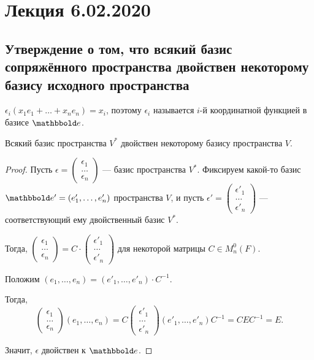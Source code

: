 \section{Лекция 6.02.2020}


\subsection{Утверждение о том, что всякий базис сопряжённого пространства двойствен некоторому базису исходного пространства}

$\epsilon_i (x_1 e_1 + \dots + x_n e_n) = x_i$, поэтому $\epsilon_i$ называется $i$-й координатной функцией в базисе $\E$.

\begin{proposal}
    Всякий базис пространства $V^*$ двойствен некоторому базису пространства $V$. 
\end{proposal}

\begin{proof}
    Пусть $\epsilon = \begin{pmatrix} \epsilon_1 \\ \dots \\ \epsilon_n \end{pmatrix}$ --- базис пространства $V^*$.
    Фиксируем какой-то базис $\E' = (e'_1, \dots, e'_n)$ пространства $V$, и пусть $\epsilon' = \begin{pmatrix} \epsilon'_1 \\ \dots \\ \epsilon'_n \end{pmatrix}$ --- соответствующий ему двойственный базис $V^*$.

    Тогда, 
    $\begin{pmatrix} \epsilon_1 \\ \dots \\ \epsilon_n \end{pmatrix} = C \cdot \begin{pmatrix} \epsilon'_1 \\ \dots \\ \epsilon'_n \end{pmatrix}$
    для некоторой матрицы $C \in M^0_n(F)$.

    \bigskip
    Положим $(e_1, \dots, e_n) = (e'_1, \dots, e'_n) \cdot C^{-1}$.

    Тогда, 
    \begin{equation*}
        \begin{pmatrix} \epsilon_1 \\ \dots \\ \epsilon_n \end{pmatrix} (e_1, \dots, e_n) = C \begin{pmatrix} \epsilon'_1 \\ \dots \\ \epsilon'_n \end{pmatrix} (e'_1, \dots, e'_n) C^{-1} = C E C^{-1} = E
    .\end{equation*}

    Значит, $\epsilon$ двойствен к $\E$.
\end{proof}

